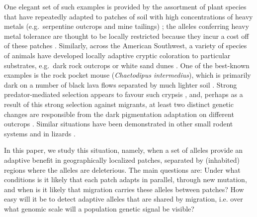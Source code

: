 \documentclass{article}
\begin{document}
One elegant set of such examples is provided by the assortment of plant species 
that have repeatedly adapted to patches of soil with high concentrations of heavy metals
(e.g.\ serpentine outcrops and mine tailings) \citep{macnair1991evolution,schat1996identical,turner2010serpentine};
the alleles conferring heavy metal tolerance are thought to be locally restricted 
because they incur a cost off of these patches \citep{wright2013indirect}.
Similarly, across the American Southwest, a variety of species of animals have developed locally adaptive cryptic coloration
to particular substrates, e.g.\ dark rock outcrops or white sand dunes
\citep{benson1933concealing, DiceBlossom1937}.
One of the best-known examples is the rock pocket mouse (\textit{Chaetodipus intermedius}),
which is primarily dark on a number of black lava flows separated by
much lighter soil \citep{dice1940ecologic, DiceBlossom1937}.
Strong predator-mediated selection appears to favour such crypsis \citep{kaufman1974adaptive},
and, perhaps as a result of this strong selection against migrants, 
at least two distinct genetic changes are responsible from the dark pigmentation adaptation on different outcrops \citep{hoekstra2003different}. 
Similar situations have been demonstrated in other small rodent systems \citep{steiner2009genetic,kingsley2009melanism}
and in lizards \citep{rosenblum2010molecular}.

In this paper, we study this situation, namely,
when a set of alleles provide an adaptive benefit in geographically localized patches, 
separated by (inhabited) regions where the alleles are deleterious.
The main questions are:
Under what conditions is it likely that each patch adapts in parallel, through new mutation,
and when is it likely that migration carries these alleles between patches?
How easy will it be to detect adaptive alleles that are shared by
migration, i.e. over what genomic scale will a population genetic
signal be visible?
\end{document}
